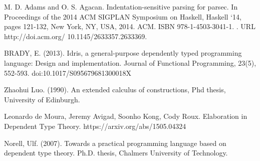 \begin{thebibliography}{99}


 M. D. Adams and O. S. Agacan. Indentation-sensitive
  parsing for parsec. In Proceedings of the 2014 ACM SIGPLAN Symposium on
  Haskell, Haskell `14, pages 121-132, New York, NY, USA, 2014.  ACM. ISBN
  978-1-4503-3041-1. . URL http://doi.acm.org/ 10.1145/2633357.2633369.


    BRADY, E. (2013). Idris, a general-purpose dependently typed programming
        language: Design and implementation. Journal of Functional Programming,
        23(5), 552-593. doi:10.1017/S095679681300018X


 Zhaohui Luo. (1990). An extended calculus of constructions,
  Phd thesis, University of Edinburgh.


 Leonardo de Moura, Jeremy Avigad, Soonho Kong, Cody Roux.
    Elaboration in Dependent Type Theory. https://arxiv.org/abs/1505.04324



 Norell, Ulf. (2007). Towards a practical programming
    language based on dependent type theory.  Ph.D. thesis, Chalmers University
        of Technology.

\end{thebibliography}


